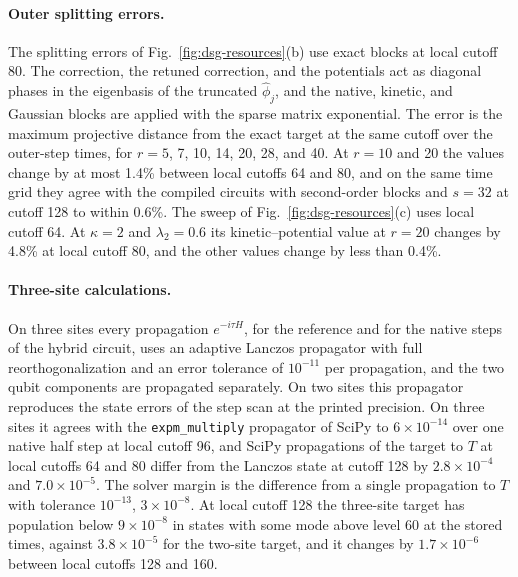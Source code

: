 \documentclass[pra,twocolumn,superscriptaddress,nofootinbib,floatfix]{revtex4-2}
\theoremstyle{remark}
\newcommand{\revcolor}{\color{blue}}
\DeclareRobustCommand{\rev}[1]{{\revcolor #1}}
\begin{document}
\paragraph{\rev{Outer splitting errors.}}
\rev{The splitting errors of Fig.~\ref{fig:dsg-resources}(b) use exact blocks at local cutoff 80.} \rev{The correction, the retuned correction, and the potentials act as diagonal phases in the eigenbasis of the truncated \(\hat\phi_j\), and the native, kinetic, and Gaussian blocks are applied with the sparse matrix exponential.} \rev{The error is the maximum projective distance from the exact target at the same cutoff over the outer-step times, for \(r=5\), 7, 10, 14, 20, 28, and 40.} \rev{At \(r=10\) and 20 the values change by at most 1.4\% between local cutoffs 64 and 80, and on the same time grid they agree with the compiled circuits with second-order blocks and \(s=32\) at cutoff 128 to within 0.6\%.} \rev{The sweep of Fig.~\ref{fig:dsg-resources}(c) uses local cutoff 64.} \rev{At \(\kappa=2\) and \(\lambda_2=0.6\) its kinetic--potential value at \(r=20\) changes by 4.8\% at local cutoff 80, and the other values change by less than 0.4\%.}

\paragraph{\rev{Three-site calculations.}}
\rev{On three sites every propagation \(e^{-i\tau H}\), for the reference and for the native steps of the hybrid circuit, uses an adaptive Lanczos propagator \cite{Park1986Lanczos,Hochbruck1997Krylov} with full reorthogonalization and an error tolerance of \(10^{-11}\) per propagation, and the two qubit components are propagated separately.} \rev{On two sites this propagator reproduces the state errors of the step scan at the printed precision.} \rev{On three sites it agrees with the \texttt{expm\_multiply} propagator of SciPy to \(6\times10^{-14}\) over one native half step at local cutoff 96, and SciPy propagations of the target to \(T\) at local cutoffs 64 and 80 differ from the Lanczos state at cutoff 128 by \(2.8\times10^{-4}\) and \(7.0\times10^{-5}\).} \rev{The solver margin is the difference from a single propagation to \(T\) with tolerance \(10^{-13}\), \(3\times10^{-8}\).} \rev{At local cutoff 128 the three-site target has population below \(9\times10^{-8}\) in states with some mode above level 60 at the stored times, against \(3.8\times10^{-5}\) for the two-site target, and it changes by \(1.7\times10^{-6}\) between local cutoffs 128 and 160.}
\end{document}
